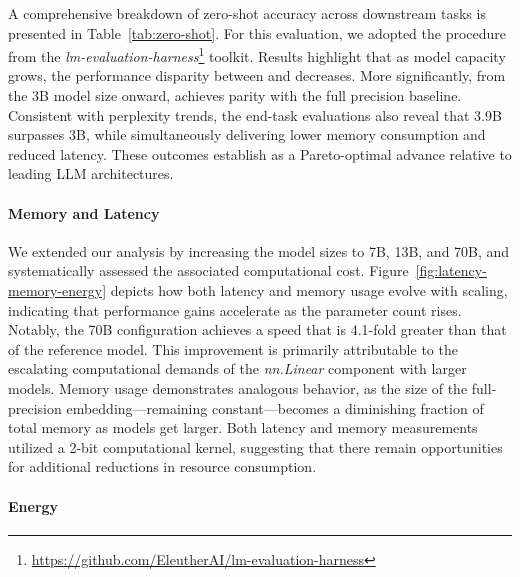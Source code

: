 A comprehensive breakdown of zero-shot accuracy across downstream tasks is presented in Table~\ref{tab:zero-shot}. For this evaluation, we adopted the procedure from the \emph{lm-evaluation-harness}\footnote{\url{https://github.com/EleutherAI/lm-evaluation-harness}} toolkit. Results highlight that as model capacity grows, the performance disparity between  and  decreases. More significantly, from the 3B model size onward,  achieves parity with the full precision baseline. Consistent with perplexity trends, the end-task evaluations also reveal that  3.9B surpasses  3B, while simultaneously delivering lower memory consumption and reduced latency. These outcomes establish  as a Pareto-optimal advance relative to leading LLM architectures.

\paragraph{Memory and Latency}

We extended our analysis by increasing the model sizes to 7B, 13B, and 70B, and systematically assessed the associated computational cost. Figure~\ref{fig:latency-memory-energy} depicts how both latency and memory usage evolve with scaling, indicating that performance gains accelerate as the parameter count rises. Notably, the  70B configuration achieves a speed that is 4.1-fold greater than that of the  reference model. This improvement is primarily attributable to the escalating computational demands of the \emph{nn.Linear} component with larger models. Memory usage demonstrates analogous behavior, as the size of the full-precision embedding—remaining constant—becomes a diminishing fraction of total memory as models get larger. Both latency and memory measurements utilized a 2-bit computational kernel, suggesting that there remain opportunities for additional reductions in resource consumption.

\paragraph{Energy}

